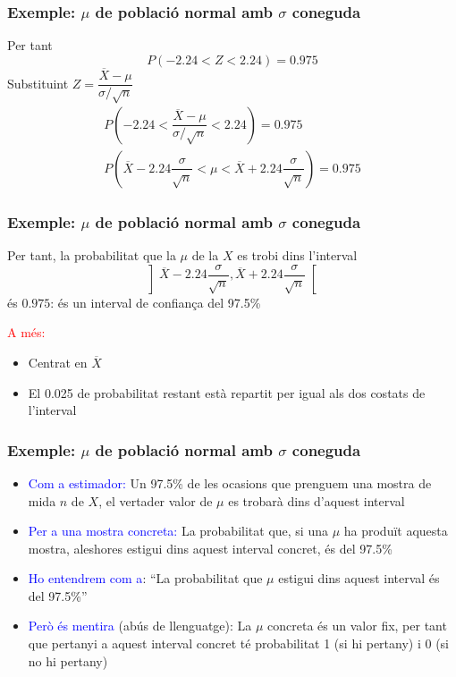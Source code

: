 \documentclass[12pt,t]{beamer}
\newcommand{\red}[1]{\textcolor{red}{#1}}
\newcommand{\blue}[1]{\textcolor{blue}{#1}}
\renewcommand{\emph}[1]{{\color{red}#1}}
\theoremstyle{plain}
\theoremstyle{definition}
\begin{document}
\begin{frame}
\frametitle{Exemple: $\mu$ de població normal amb $\sigma$ coneguda}
Per tant
$$
P(-2.24<Z<2.24)=0.975
$$
Substituint $Z=\dfrac{\overline{X}-\mu}{\sigma/\sqrt{n}}$
$$
\begin{array}{c}
P\left(-2.24<\dfrac{\overline{X}-\mu}{\sigma/\sqrt{n}}
<2.24\right)=0.975\\[3ex]
P\left(\overline{X} -2.24 \dfrac{\sigma}{\sqrt{n}}< \mu< \overline{X}+
2.24\dfrac{\sigma}{\sqrt{n}}\right)=0.975
\end{array}
$$
\end{frame}

\begin{frame}
\frametitle{Exemple: $\mu$ de població normal amb $\sigma$ coneguda}
Per tant, la probabilitat que la $\mu$ de la $X$ es trobi dins l'interval
$$
\left]\overline{X} -2.24 \frac{\sigma}{\sqrt{n}},
\overline{X}+ 2.24\frac{\sigma}{\sqrt{n}}
\right[
$$
és $0.975$: és un interval de confiança del 97.5\%
\pause\medskip

\red{A més:}
\begin{itemize}
\item Centrat en $\overline{X}$
\medskip

\item El 0.025 de probabilitat restant està repartit per igual als dos costats de l'interval
\end{itemize}
\end{frame}

\begin{frame}
\frametitle{Exemple: $\mu$ de població normal amb $\sigma$ coneguda}


\begin{itemize}
\item \blue{Com a estimador:} Un 97.5\% de les ocasions que prenguem una mostra de mida $n$ de $X$, el vertader valor de $\mu$ es trobarà dins d'aquest interval 
\medskip

\item \blue{Per a una mostra concreta:} La probabilitat que, si  una $\mu$ ha produït aquesta mostra, aleshores estigui dins aquest interval concret, és del 97.5\%
\medskip

\item \blue{Ho entendrem com a}:  ``La probabilitat que $\mu$ estigui dins aquest interval  és del 97.5\%''
\medskip

\item \blue{Però és mentira} (\emph{abús de llenguatge}): La $\mu$ concreta és un valor fix, per tant que pertanyi a aquest interval concret té probabilitat 1 (si hi pertany) i 0 (si no hi pertany) 
\end{itemize}


\end{frame}
\end{document}
